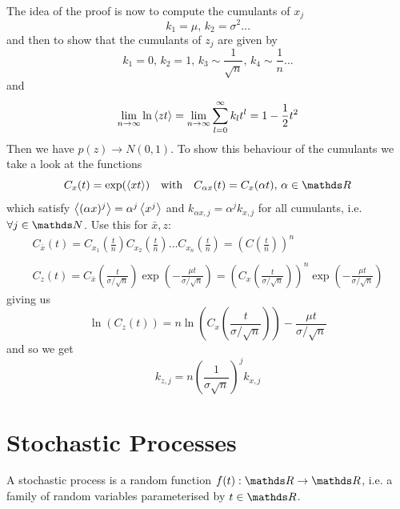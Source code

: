 \documentclass{notebook}
\begin{document}
The idea of the proof is now to compute the cumulants of $x_j$
%
\begin{equation}
k_1 = \mu, \, k_2 = \sigma^2 \dots
\end{equation}
%
and then to show that the cumulants of $z_j$ are given by
%
\begin{equation}
k_1 = 0, \, k_2 = 1, \, k_3 \sim \frac{1}{\sqrt{n}}, \, k_4 \sim \frac{1}{n} \dots
\end{equation}
%
and
%
\begin{equation}
\lim_{n \to \infty} \ln \expval{zt} = \lim_{n \to \infty} \sum_{l=0}^{\infty} k_l t^l = 1 - \frac{1}{2} t^2 
\end{equation}
%
Then we have $p(z) \to N(0,1)$. To show this behaviour of the cumulants we take a look at the functions
%
\begin{equation}
C_x(t) = \exp(\expval{xt}) \quad \mathrm{with} \quad C_{\alpha x}(t) = C_x(\alpha t), \, \alpha \in \R
\end{equation}
%
which satisfy $\expval{(\alpha x)^j} = \alpha^j \expval{x^j}$ and $k_{\alpha x, j} = \alpha^j k_{x,j}$ for all cumulants, i.e. $\forall j \in \N$. Use this for $\bar{x}, z$:
%
\begin{gather*}
	C_{\bar{x}}(t) = C_{x_1}\left( \frac{t}{n} \right) C_{x_2}\left( \frac{t}{n} \right) \dots C_{x_n}\left( \frac{t}{n} \right) = \left(C\left( \frac{t}{n} \right) \right)^n  \\ \\
	C_z(t) = C_{\bar{x}} \left( \frac{t}{\sigma/\sqrt{n}} \right) \exp(-\frac{\mu t}{\sigma/\sqrt{n}}) = \left( C_x \left( \frac{t}{\sigma/\sqrt{n}} \right) \right)^n  \exp(-\frac{\mu t}{\sigma/\sqrt{n}})
\end{gather*}
%
giving us
%
\begin{equation}
\ln(C_z(t)) = n \ln(C_x \left( \frac{t}{\sigma/\sqrt{n}} \right)) - \frac{\mu t}{\sigma/\sqrt{n}}
\end{equation}
%
and so we get
%
\begin{equation}
k_{z,j} = n \left( \frac{1}{\sigma \sqrt{n}} \right)^j k_{x,j}
\end{equation}
%


\newpage
\section{Stochastic Processes}

\begin{theorem}
	A stochastic process is a random function $f(t):\R \to \R$, i.e. a family of random variables parameterised by $t \in \R$.
\end{theorem}
\end{document}
